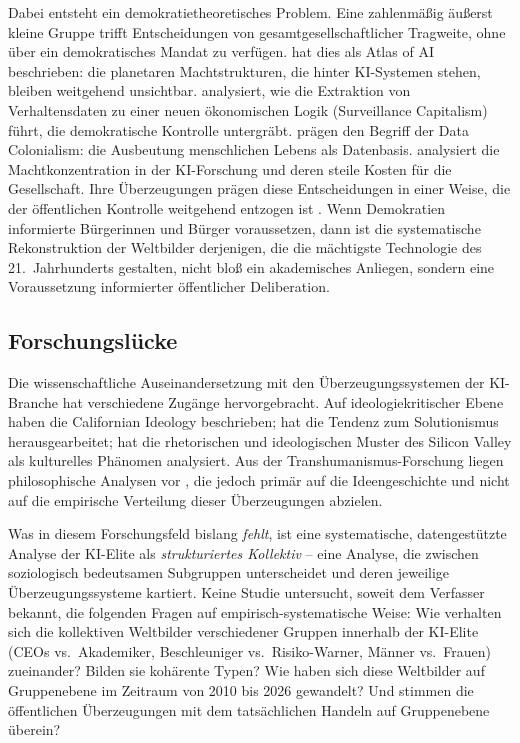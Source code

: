 \documentclass[12pt,a4paper]{article}
\begin{document}
Dabei entsteht ein demokratietheoretisches Problem. Eine zahlenm\"a\ss{}ig \"au\ss{}erst kleine Gruppe trifft Entscheidungen von gesamtgesellschaftlicher Tragweite, ohne \"uber ein demokratisches Mandat zu verf\"ugen. \citet{Crawford2021} hat dies als \glqq Atlas of AI\grqq{} beschrieben: die planetaren Machtstrukturen, die hinter KI-Systemen stehen, bleiben weitgehend unsichtbar. \citet{Zuboff2019} analysiert, wie die Extraktion von Verhaltensdaten zu einer neuen \"okonomischen Logik (\glqq Surveillance Capitalism\grqq{}) f\"uhrt, die demokratische Kontrolle untergr\"abt. \citet{Couldry2019} pr\"agen den Begriff der \glqq Data Colonialism\grqq{}: die Ausbeutung menschlichen Lebens als Datenbasis. \citet{Whittaker2021} analysiert die Machtkonzentration in der KI-Forschung und deren \glqq steile Kosten\grqq{} f\"ur die Gesellschaft. Ihre \"Uberzeugungen pr\"agen diese Entscheidungen in einer Weise, die der \"offentlichen Kontrolle weitgehend entzogen ist \citep{Floridi2019, Floridi2023}. Wenn Demokratien informierte B\"urgerinnen und B\"urger voraussetzen, dann ist die systematische Rekonstruktion der Weltbilder derjenigen, die die m\"achtigste Technologie des 21.~Jahrhunderts gestalten, nicht blo\ss{} ein akademisches Anliegen, sondern eine Voraussetzung informierter \"offentlicher Deliberation.


\subsection{Forschungsl\"ucke}
\label{sec:einleitung:luecke}

Die wissenschaftliche Auseinandersetzung mit den \"Uberzeugungssystemen der KI-Branche hat verschiedene Zug\"ange hervorgebracht. Auf ideologiekritischer Ebene haben \citet{BarbCam1996} die \glqq Californian Ideology\grqq{} beschrieben; \citet{Morozov2013} hat die Tendenz zum Solutionismus herausgearbeitet; \citet{Daub2020} hat die rhetorischen und ideologischen Muster des Silicon Valley als kulturelles Ph\"anomen analysiert. Aus der Transhumanismus-Forschung liegen philosophische Analysen vor \citep{Bostrom2005, MoreVitaMore2013, Coeckelbergh2020}, die jedoch prim\"ar auf die Ideengeschichte und nicht auf die empirische Verteilung dieser \"Uberzeugungen abzielen.

Was in diesem Forschungsfeld bislang \emph{fehlt}, ist eine systematische, datengest\"utzte Analyse der KI-Elite als \emph{strukturiertes Kollektiv} -- eine Analyse, die zwischen soziologisch bedeutsamen Subgruppen unterscheidet und deren jeweilige \"Uberzeugungssysteme kartiert. Keine Studie untersucht, soweit dem Verfasser bekannt, die folgenden Fragen auf empirisch-systematische Weise: Wie verhalten sich die kollektiven Weltbilder verschiedener Gruppen innerhalb der KI-Elite (CEOs vs.\ Akademiker, Beschleuniger vs.\ Risiko-Warner, M\"anner vs.\ Frauen) zueinander? Bilden sie koh\"arente Typen? Wie haben sich diese Weltbilder auf Gruppenebene im Zeitraum von 2010 bis 2026 gewandelt? Und stimmen die \"offentlichen \"Uberzeugungen mit dem tats\"achlichen Handeln auf Gruppenebene \"uberein?
\end{document}
